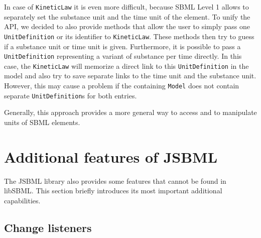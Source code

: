 \documentclass[
  BCOR12mm,
  letterpaper,
  11pt,
  headsepline,
  pointlessnumbers,
  tablecaptionabove,
  onelinecaption,
  headinclude,
  appendixprefix,
  idxtotoc,
  bibtotoc,
  twoside,
  titlepage
]{scrartcl}
\begin{document}
In case of \texttt{KineticLaw}
it is even more difficult, because
SBML Level 1 allows to separately set the substance unit and the time unit of
the element. To unify the API, we decided to also provide methods that allow
the user to simply pass one \texttt{UnitDefinition}
or its identifier to
\texttt{KineticLaw}.
These methods then try to guess if a substance unit or time
unit is given. Furthermore, it is possible to pass a \texttt{UnitDefinition}
representing a variant of substance per time directly. In this case, the
\texttt{KineticLaw}
will memorize a direct link to this \texttt{UnitDefinition}
in the model and also try to save separate links to the time unit and the
substance unit. However, this may cause a problem if the containing
\texttt{Model} does not contain separate \texttt{UnitDefinition}s for both
entries.

Generally, this approach provides a more general way to access and to manipulate
units of SBML elements.

\section{Additional features of JSBML}

The JSBML library also provides some features that cannot be found in libSBML.
This section briefly introduces its most important additional capabilities.

\subsection{Change listeners}
\end{document}
